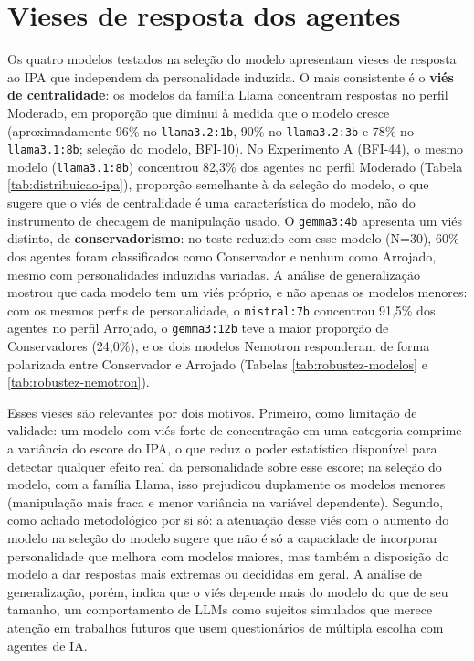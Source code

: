 \section{Vieses de resposta dos agentes}
\label{sec:vieses}

Os quatro modelos testados na seleção do modelo apresentam vieses de
resposta ao IPA que independem da personalidade induzida. O mais
consistente é o \textbf{viés de centralidade}: os modelos da família
Llama concentram respostas no perfil Moderado, em proporção que diminui à
medida que o modelo cresce (aproximadamente 96\% no \texttt{llama3.2:1b},
90\% no \texttt{llama3.2:3b} e 78\% no \texttt{llama3.1:8b}; seleção
do modelo, BFI-10). No Experimento A (BFI-44), o mesmo modelo
(\texttt{llama3.1:8b}) concentrou 82,3\% dos agentes no perfil Moderado
(Tabela \ref{tab:distribuicao-ipa}), proporção semelhante à da seleção do modelo, o
que sugere que o viés de centralidade é uma característica do modelo, não
do instrumento de checagem de manipulação usado. O \texttt{gemma3:4b}
apresenta um viés distinto, de \textbf{conservadorismo}: no teste
reduzido com esse modelo (N=30), 60\% dos agentes foram classificados
como Conservador e nenhum como Arrojado, mesmo com personalidades
induzidas variadas. A análise de generalização mostrou que cada modelo
tem um viés próprio, e não apenas os modelos menores: com os mesmos
perfis de personalidade, o \texttt{mistral:7b} concentrou 91,5\% dos
agentes no perfil Arrojado, o \texttt{gemma3:12b} teve a maior proporção
de Conservadores (24,0\%), e os dois modelos Nemotron responderam de
forma polarizada entre Conservador e Arrojado (Tabelas
\ref{tab:robustez-modelos} e \ref{tab:robustez-nemotron}).

Esses vieses são relevantes por dois motivos. Primeiro, como limitação de
validade: um modelo com viés forte de concentração em uma categoria
comprime a variância do escore do IPA, o que reduz o poder estatístico
disponível para detectar qualquer efeito real da personalidade sobre esse
escore; na seleção do modelo, com a família Llama, isso prejudicou duplamente os
modelos menores (manipulação mais fraca e menor variância na variável
dependente). Segundo, como achado metodológico por si só: a atenuação
desse viés com o aumento do modelo na seleção do modelo sugere que não é só a
capacidade de incorporar personalidade que melhora com modelos maiores,
mas também a disposição do modelo a dar respostas mais extremas ou
decididas em geral. A análise de generalização, porém, indica que o viés
depende mais do modelo do que de seu tamanho, um comportamento de LLMs
como sujeitos simulados que merece atenção em trabalhos futuros que usem
questionários de múltipla escolha com agentes de IA.

